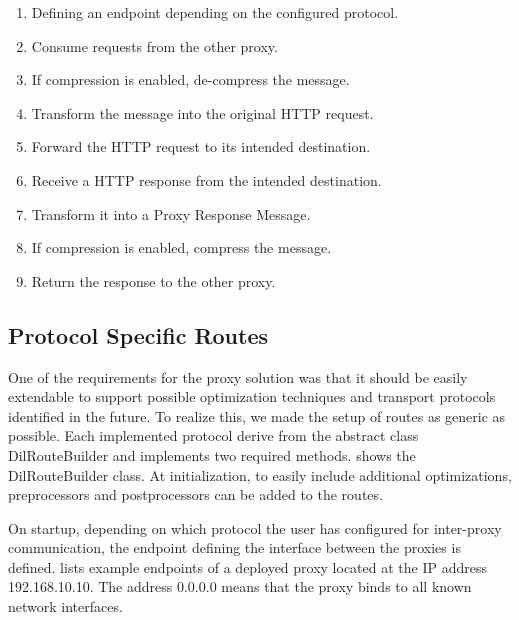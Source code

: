 \begin{enumerate}
	\item Defining an endpoint depending on the configured protocol.
	\item Consume requests from the other proxy.
	\item If compression is enabled, de-compress the message.
	\item Transform the message into the original HTTP request.
	\item Forward the HTTP request to its intended destination.
	\item Receive a HTTP response from the intended destination.
	\item Transform it into a Proxy Response Message.
	\item If compression is enabled, compress the message.
	\item Return the response to the other proxy.
\end{enumerate}

\subsection{Protocol Specific Routes}
\label{section:protocol-routes}

One of the requirements for the proxy solution was that it should be easily
extendable to support possible optimization techniques and transport protocols
identified in the future. To realize this, we made the setup of routes as
generic as possible. Each implemented protocol derive from the abstract class
DilRouteBuilder and implements two required methods. 
shows the DilRouteBuilder class. At initialization, to easily include additional
optimizations, preprocessors and postprocessors can be added to the routes.




On startup, depending on which protocol the user has configured for inter-proxy
communication, the endpoint defining the interface between the proxies is
defined.  lists example endpoints of a deployed
proxy located at the IP address 192.168.10.10. The address 0.0.0.0 means that
the proxy binds to all known network interfaces.

